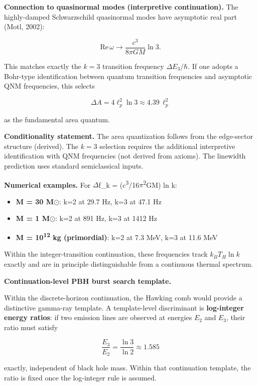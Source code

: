\textbf{Connection to quasinormal modes (interpretive continuation).} The highly-damped Schwarzschild quasinormal modes have asymptotic real part (Motl, 2002):

\[
\mathrm{Re}\,\omega \to \frac{c^3}{8\pi G M} \ln 3.
\]

This matches exactly the \(k = 3\) transition frequency \(\Delta E_3 / \hbar\). If one adopts a Bohr-type identification between quantum transition frequencies and asymptotic QNM frequencies, this selects

\[
\Delta A = 4\ell_p^2 \ln 3 \approx 4.39 \, \ell_p^2
\]

as the fundamental area quantum.

\textbf{Conditionality statement.} The area quantization follows from the edge-sector structure (derived). The \(k = 3\) selection requires the additional interpretive identification with QNM frequencies (not derived from axioms). The linewidth prediction uses standard semiclassical inputs.

\textbf{Numerical examples.} For \ensuremath{\Delta}f\_k = (c\textsuperscript{3}/16\ensuremath{\pi}\textsuperscript{2}GM) ln k:

\begin{itemize}
\tightlist
\item
  \textbf{M = 30 M\ensuremath{\odot}}: k=2 at 29.7 Hz, k=3 at 47.1 Hz
\item
  \textbf{M = 1 M\ensuremath{\odot}}: k=2 at 891 Hz, k=3 at 1412 Hz
\item
  \textbf{M = 10\textsuperscript{1}\textsuperscript{2} kg (primordial)}: k=2 at 7.3 MeV, k=3 at 11.6 MeV
\end{itemize}

Within the integer-transition continuation, these frequencies track \(k_B T_H \ln k\) exactly and are in principle distinguishable from a continuous thermal spectrum.

\textbf{Continuation-level PBH burst search template.}

Within the discrete-horizon continuation, the Hawking comb would provide a distinctive gamma-ray template. A template-level discriminant is \textbf{log-integer energy ratios}: if two emission lines are observed at energies \(E_2\) and \(E_3\), their ratio must satisfy

\[
\frac{E_3}{E_2} = \frac{\ln 3}{\ln 2} \approx 1.585
\]

exactly, independent of black hole mass. Within that continuation template, the ratio is fixed once the log-integer rule is assumed.

